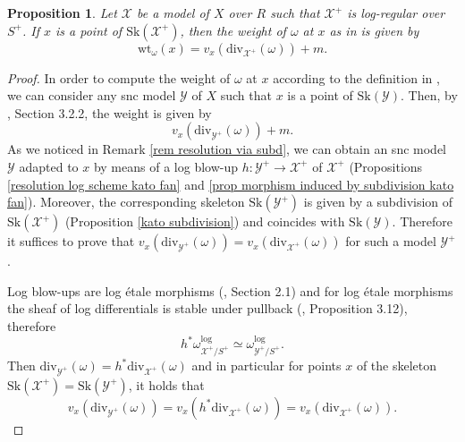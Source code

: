 \documentclass{amsart}%
\numberwithin{equation}{subsection}
\theoremstyle{plain2}
\newtheorem{prop}[equation]{Proposition}
\theoremstyle{definition2}
\theoremstyle{stepstyle}
\theoremstyle{point}
\theoremstyle{subpoint}
\newcommand{\cX}{\ensuremath{\mathscr{X}}}
\newcommand{\cY}{\ensuremath{\mathscr{Y}}}
\renewcommand{\cY}{\ensuremath{\mathscr{Y}}}
\newcommand{\divisor}{\mathrm{div}}
\newcommand{\weight}{\mathrm{wt}}
\newcommand{\Sk}{\mathrm{Sk}}
\begin{document}

\begin{prop} \label{prop weight function log formula}
Let $\cX$ be a model of $X$ over $R$ such that $\cX^+$ is log-regular over $S^+$. If $x$ is a point of $\Sk(\cX^+)$, then the weight of $\omega$ at $x$ as in \cite{MustataNicaise} is given by $$\weight_{\omega}(x)=v_x(\divisor_{\cX^+}(\omega)) +m.$$
\end{prop}
\begin{proof}
In order to compute the weight of $\omega$ at $x$ according to the definition in \cite{MustataNicaise}, we can consider any snc model $\cY$ of $X$ such that $x$ is a point of $\Sk(\cY)$. Then, by \cite{NicaiseXu}, Section 3.2.2, the weight is given by $$v_x(\divisor_{\cY^+}(\omega))+m.$$
As we noticed in Remark \ref{rem resolution via subd}, we can obtain an snc model $\cY$ adapted to $x$ by means of a log blow-up $h: \cY^+ \rightarrow \cX^+$ of $\cX^+$ (Propositions \ref{resolution log scheme kato fan} and \ref{prop morphism induced by subdivision kato fan}). Moreover, the corresponding skeleton $\Sk(\cY^+)$ is given by a subdivision of $\Sk(\cX^+)$ (Proposition \ref{kato subdivision}) and coincides with $\Sk(\cY)$. Therefore it suffices to prove that $v_x(\divisor_{\cY^+}(\omega)) =   v_x(\divisor_{\cX^+}(\omega))$ for such a model $\cY^+$.

Log blow-ups are log \'{e}tale morphisms (\cite{Saito2004}, Section 2.1) and for log \'{e}tale morphisms the sheaf of log differentials is stable under pullback (\cite{Kato1994a}, Proposition 3.12), therefore $$h^* \omega_{\cX^+/ S^+}^{\text{log}} \simeq \omega_{\cY^+/S^+}^{\text{log}}.$$ Then $\divisor_{\cY^+}(\omega)=h^* \divisor_{\cX^+}(\omega)$ and in particular for points $x$ of the skeleton $\Sk(\cX^+) = \Sk(\cY^+)$, it holds that $$v_{x}(\divisor_{\cY^+}(\omega))= v_{x}(h^*\divisor_{\cX^+}(\omega))= v_x(\divisor_{\cX^+}(\omega)).$$
\end{proof}
\end{document}
